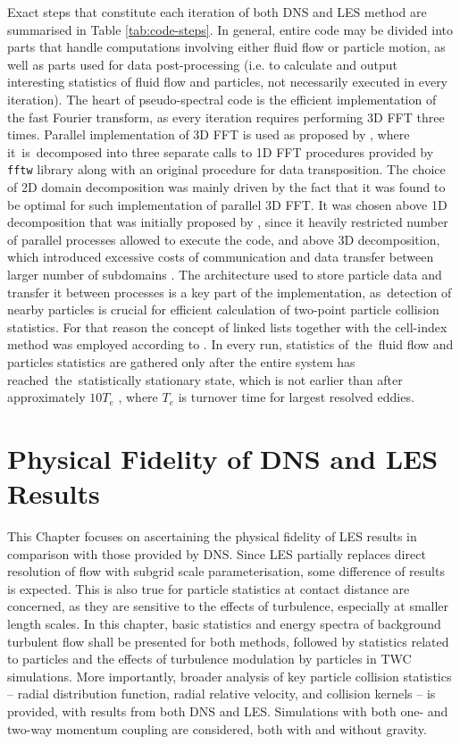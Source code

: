 \documentclass{pracamgren}
\begin{document}
Exact steps that constitute each iteration of both DNS and LES method are summarised in Table \ref{tab:code-steps}.
In general, entire code may be divided into parts that handle computations involving either fluid flow or particle motion, as well as parts used for data post-processing (i.e. to calculate and output interesting statistics of fluid flow and particles, not necessarily executed in every iteration).
The heart of pseudo-spectral code is the efficient implementation of the fast Fourier transform, as every iteration requires performing 3D FFT three times.
Parallel implementation of 3D FFT is used as proposed by \textcite{Ayala2013}, where it~is~decomposed into three separate calls to 1D FFT procedures provided by \texttt{fftw} library along with an original procedure for data transposition.
The choice of 2D domain decomposition was mainly driven by the fact that it was found to be optimal for such implementation of parallel 3D FFT.  
It was chosen above 1D decomposition that was initially proposed by \textcite{Dmitruk2001}, since it heavily restricted number of parallel processes allowed to execute the code, and above 3D decomposition, which introduced excessive costs of communication and data transfer between larger number of subdomains \parencite{Ayala2013}.   
The architecture used to store particle data and transfer it between processes is a key part of the implementation, as~detection of nearby particles is crucial for efficient calculation of two-point particle collision statistics.
For that reason the concept of linked lists together with the cell-index method was employed according to \textcite[p. 149--152]{Allen1987}.
In every run, statistics of~the~fluid flow and particles statistics are gathered only after the entire system has reached~the~statistically stationary state, which is not earlier than after approximately $10 T_e$ \parencite{Rosa2017}, where $T_e$ is turnover time for largest resolved eddies.  


\chapter{Physical Fidelity of DNS and LES Results}
\label{ch:ch2}

This Chapter focuses on ascertaining the physical fidelity of LES results in comparison with those provided by DNS.
Since LES partially replaces direct resolution of flow with subgrid scale parameterisation, some difference of results is expected.
This is also true for particle statistics at contact distance are concerned, as they are sensitive to the effects of turbulence, especially at smaller length scales.
In this chapter, basic statistics and energy spectra of background turbulent flow shall be presented for both methods, followed by statistics related to particles and the effects of turbulence modulation by particles in TWC simulations.
More importantly, broader analysis of key particle collision statistics -- radial distribution function, radial relative velocity, and collision kernels -- is provided, with results from both DNS and LES.
Simulations with both one- and two-way momentum coupling are considered, both with and without gravity.
\end{document}
